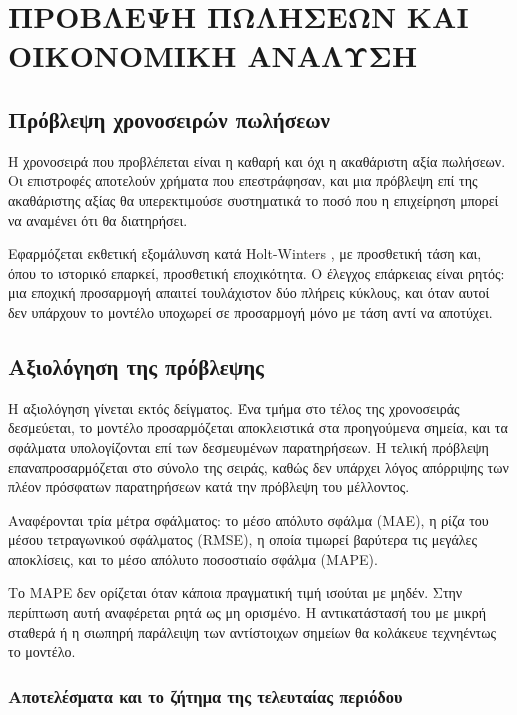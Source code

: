 \chapter{ΠΡΟΒΛΕΨΗ ΠΩΛΗΣΕΩΝ ΚΑΙ ΟΙΚΟΝΟΜΙΚΗ ΑΝΑΛΥΣΗ}
\label{chap:forecasting-economics}

\section{Πρόβλεψη χρονοσειρών πωλήσεων}
\label{sec:forecasting}

Η χρονοσειρά που προβλέπεται είναι η καθαρή και όχι η ακαθάριστη αξία
πωλήσεων. Οι επιστροφές αποτελούν χρήματα που επεστράφησαν, και μια πρόβλεψη
επί της ακαθάριστης αξίας θα υπερεκτιμούσε συστηματικά το ποσό που η
επιχείρηση μπορεί να αναμένει ότι θα διατηρήσει.

Εφαρμόζεται εκθετική εξομάλυνση κατά Holt-Winters
\cite{holt1957,winters1960}, με προσθετική τάση και,
όπου το ιστορικό επαρκεί, προσθετική εποχικότητα. Ο έλεγχος επάρκειας είναι
ρητός: μια εποχική προσαρμογή απαιτεί τουλάχιστον δύο πλήρεις κύκλους, και
όταν αυτοί δεν υπάρχουν το μοντέλο υποχωρεί σε προσαρμογή μόνο με τάση αντί να
αποτύχει.

\section{Αξιολόγηση της πρόβλεψης}

Η αξιολόγηση γίνεται εκτός δείγματος. Ένα τμήμα στο τέλος της χρονοσειράς
δεσμεύεται, το μοντέλο προσαρμόζεται αποκλειστικά στα προηγούμενα σημεία, και
τα σφάλματα υπολογίζονται επί των δεσμευμένων παρατηρήσεων. Η τελική πρόβλεψη
επαναπροσαρμόζεται στο σύνολο της σειράς, καθώς δεν υπάρχει λόγος απόρριψης των
πλέον πρόσφατων παρατηρήσεων κατά την πρόβλεψη του μέλλοντος.

Αναφέρονται τρία μέτρα σφάλματος: το μέσο απόλυτο σφάλμα
(\textenglish{MAE}), η ρίζα του μέσου τετραγωνικού σφάλματος
(\textenglish{RMSE}), η οποία τιμωρεί βαρύτερα τις μεγάλες αποκλίσεις, και το
μέσο απόλυτο ποσοστιαίο σφάλμα (\textenglish{MAPE}).

Το \textenglish{MAPE} δεν ορίζεται όταν κάποια πραγματική τιμή ισούται με
μηδέν. Στην περίπτωση αυτή αναφέρεται ρητά ως μη ορισμένο. Η αντικατάστασή του
με μικρή σταθερά ή η σιωπηρή παράλειψη των αντίστοιχων σημείων θα κολάκευε
τεχνηέντως το μοντέλο.

\subsection{Αποτελέσματα και το ζήτημα της τελευταίας περιόδου}

